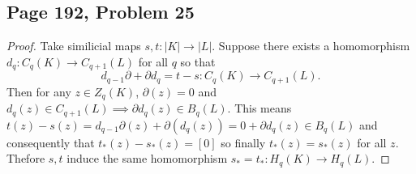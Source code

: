 \subsection*{Page 192, Problem 25}
\vspace{15pt}
\begin{proof}
    \vspace{-10pt}
    Take similicial maps $s,t\colon|K|\to|L|$. Suppose there exists a homomorphism $d_q\colon C_q(K)\to C_{q+1}(L)$ for all $q$ so that $$d_{q-1}\partial + \partial d_q = t-s\colon C_q(K)\to C_{q+1}(L).$$ Then for any $z \in Z_q(K)$, $\partial(z) = 0$ and $d_q(z) \in C_{q+1}(L) \implies \partial d_q(z) \in B_q(L)$. This means $t(z) - s(z) = d_{q-1}\partial(z) + \partial(d_q(z)) = 0 + \partial d_q(z) \in B_q(L)$ and consequently that $t_*(z) - s_*(z) = [0]$ so finally $t_*(z) = s_*(z)$ for all $z$. Thefore $s,t$ induce the same homomorphism $s_* = t_*\colon H_q(K) \to H_q(L)$.
\end{proof}